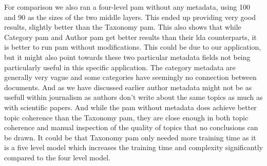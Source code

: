 For comparison we also ran a four-level \gls{pam} without any metadata, using 100 and 90 as the sizes of the two middle layers.
This ended up providing very good results, slightly better than the Taxonomy \gls{pam}.
This also shows that while Category \gls{pam} and Author \gls{pam} get better results than their \gls{lda} counterparts, it is better to run \gls{pam} without modifications.
This could be due to our application, but it might also point towards these two particular metadata fields not being particularly useful in this specific application.
The category metadata are generally very vague and some categories have seemingly no connection between documents.
And as we have discussed earlier author metadata might not be as usefull within journalism as authors don't write about the same topics as much as with scientific papers.
And while the \gls{pam} without metadata does achieve better topic coherence than the Taxonomy \gls{pam}, they are close enough in both topic coherence and manual inspection of the quality of topics that no conclusions can be drawn.
It could be that Taxonomy \gls{pam} only needed more training time as it is a five level model which increases the training time and complexity significantly compared to the four level model.
